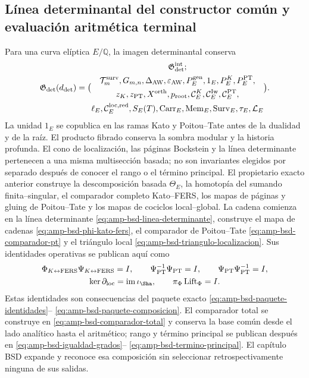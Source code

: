 \subsection{Línea determinantal del constructor común y evaluación aritmética terminal}

Para una curva elíptica $E/\mathbb Q$, la imagen determinantal conserva
\begin{equation}\label{eq:pdf2-g-det-explicito}
 \mathfrak G_{\rm det}(d_{\rm det})=
 \bigl(
 \begin{gathered}
  \mathfrak G_{\rm det}^{\rm int};\\
  \mathcal T_m^{\rm surv},G_{m,n},\Delta_{\rm AW},\varepsilon_{\rm AW},
  P_E^{\rm gen},1_E,P_E^K,P_E^{\rm PT},\\
  z_K,z_{\rm PT},X^{\rm orth},p_{\rm root},
  \mathcal C_E^K,\mathcal C_E^{\rm Iw},\mathcal C_E^{\rm PT},\\
  \ell_E,\mathcal C_E^{\rm loc,red},S_E(T),
  \operatorname{Carr}_E,\operatorname{Mem}_E,
  \operatorname{Surv}_E,\tau_E,\mathcal L_E
 \end{gathered}
 \bigr).
\end{equation}
La unidad $1_E$ se copublica en las ramas Kato y Poitou--Tate antes de la dualidad y
de la raíz. El producto fibrado conserva la sombra modular y la historia profunda.
El cono de localización, las páginas Bockstein y la línea determinante pertenecen a
una misma multisección basada; no son invariantes elegidos por separado después de
conocer el rango o el término principal.
El propietario exacto anterior construye la descomposición basada
$\Theta_E$, la homotopía del sumando finita--singular, el comparador completo
Kato--FERS, los mapas de páginas y gluing de Poitou--Tate y los mapas de
cociclos local--global. La cadena comienza en la línea determinante
\eqref{eq:amp-bsd-linea-determinante}, construye el mapa de cadenas
\eqref{eq:amp-bsd-phi-kato-fers}, el comparador de Poitou--Tate
\eqref{eq:amp-bsd-comparador-pt} y el triángulo local
\eqref{eq:amp-bsd-triangulo-localizacion}. Sus identidades operativas se
publican aquí como
\begin{equation}\label{eq:pdf2-g-det-identidades-dato}
\begin{gathered}
 \Phi_{K\leftrightarrow{\rm FERS}}\Psi_{K\leftrightarrow{\rm FERS}}=I,
 \qquad
 \Psi_{\rm PT}^{-1}\Psi_{\rm PT}=I,
 \qquad
 \Psi_{\rm PT}\Psi_{\rm PT}^{-1}=I,\\
 \ker\partial_{\rm loc}=\operatorname{im}\iota_{\Sha},
 \qquad
 \pi_\Phi\operatorname{Lift}_\Phi=I.
\end{gathered}
\end{equation}
Estas identidades son consecuencias del paquete exacto
\eqref{eq:amp-bsd-paquete-identidades}--
\eqref{eq:amp-bsd-paquete-composicion}. El comparador total se construye en
\eqref{eq:amp-bsd-comparador-total} y conserva la base común desde el lado
analítico hasta el aritmético; rango y término principal se publican después
en \eqref{eq:amp-bsd-igualdad-grados}--
\eqref{eq:amp-bsd-termino-principal}. El capítulo BSD expande y reconoce esa
composición sin seleccionar retrospectivamente ninguna de sus salidas.

